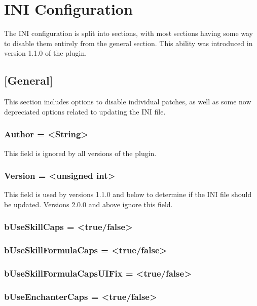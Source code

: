 \documentclass[12pt]{amsart}
\begin{document}
\startblock
\section{INI Configuration}

The INI configuration is split into sections, with most sections having some
way to disable them entirely from the general section. This ability was
introduced in version 1.1.0 of the plugin.
\stopblock

\startblock
\subsection{[General]}

This section includes options to disable individual patches, as well as some
now depreciated options related to updating the INI file.
\stopblock

\startblock
\subsubsection{Author = <String>}

This field is ignored by all versions of the plugin.
\stopblock

\startblock
\subsubsection{Version = <unsigned int>}

This field is used by versions 1.1.0 and below to determine if the INI file
should be updated. Versions 2.0.0 and above ignore this field.
\stopblock

\subsubsection{bUseSkillCaps = <true/false>}

\subsubsection{bUseSkillFormulaCaps = <true/false>}

\subsubsection{bUseSkillFormulaCapsUIFix = <true/false>}

\subsubsection{bUseEnchanterCaps = <true/false>}
\end{document}
